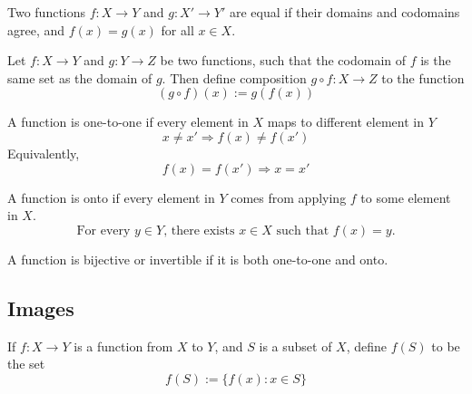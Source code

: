 \documentclass{blog}
\begin{document}
\begin{definition}
  Two functions $f: X \to Y$ and $g: X' \to Y'$ are equal if their domains and codomains agree,
  and $f(x) = g(x)$ for all $x \in X$.
\end{definition}

\begin{definition}[composition]
  Let $f: X \to Y$ and $g: Y \to Z$ be two functions,
  such that the codomain of $f$ is the same set as the domain of $g$.
  Then define composition $g \circ f: X \to Z$ to the function
  \begin{equation}
    (g \circ f)(x) := g(f(x))
  \end{equation}
\end{definition}

\begin{definition}[injective]
  A function is one-to-one if every element in $X$ maps to different element in $Y$
  \begin{equation}
    x \neq x' \Longrightarrow f(x) \neq f(x')
  \end{equation}
  Equivalently,
  \begin{equation}
    f(x) = f(x') \Longrightarrow x = x'
  \end{equation}
\end{definition}

\begin{definition}[surjective]
  A function is onto if every element in $Y$ comes from applying $f$ to some element in $X$.
  \begin{equation}
    \text{For every $y \in Y$, there exists $x \in X$ such that $f(x) = y$.}
  \end{equation}
\end{definition}

\begin{definition}[bijective]
  A function is bijective or invertible if it is both one-to-one and onto.
\end{definition}

\subsection{Images}
\begin{definition}
  If $f: X \to Y$ is a function from $X$ to $Y$, and $S$ is a subset of $X$,
  define $f(S)$ to be the set
  \begin{equation}
    f(S) := \{f(x) : x \in S\}
  \end{equation}
\end{definition}
\end{document}
